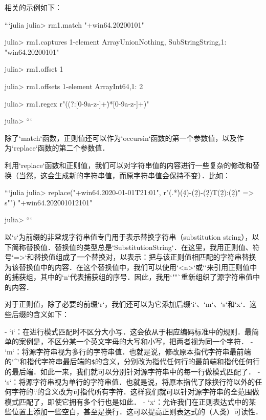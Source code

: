 相关的示例如下：

```julia
julia> rm1.match
"+win64.20200101"

julia> rm1.captures
1-element Array{Union{Nothing, SubString{String}},1}:
 "win64.20200101"

julia> rm1.offset
1

julia> rm1.offsets
1-element Array{Int64,1}:
 2

julia> rm1.regex
r"\+((?:[0-9a-z-]+\.)*[0-9a-z-]+)"

julia> 
```

除了`match`函数，正则值还可以作为`occursin`函数的第一个参数值，以及作为`replace`函数的第二个参数值．

利用`replace`函数和正则值，我们可以对字符串值的内容进行一些复杂的修改和替换（当然，这会生成新的字符串值，而原字符串值会保持不变）．比如：

```julia
julia> replace("+win64.2020-01-01T21:01", r"(.*\.)(\d{4})-(\d{2})-(\d{2})T(\d{2}):(\d{2})" => s"\1\2\3\4\5\6")
"+win64.202001012101"

julia> 
```

以`s`为前缀的非常规字符串值专门用于表示替换字符串（substitution string），以下简称替换值．替换值的类型总是`SubstitutionString`．在这里，我用正则值、符号`=>`和替换值组成了一个替换对，以表示：把与该正则值相匹配的字符串替换为该替换值中的内容．在这个替换值中，我们可以使用`\g<n>`或`\n`来引用正则值中的捕获组，其中的`n`代表捕获组的序号．因此，我用`"\1\2\3\4\5\6"`重新组织了源字符串值中的内容．

对于正则值，除了必要的前缀`r`，我们还可以为它添加后缀`i`、`m`、`s`和`x`．这些后缀的含义如下：

- `i`：在进行模式匹配时不区分大小写．这会依从于相应编码标准中的规则．最简单的案例是，不区分某一个英文字母的大写和小写，把两者视为同一个字符．
- `m`：将源字符串视为多行的字符串值．也就是说，修改原本指代字符串最前端的`^`和指代字符串最后端的\verb|$|的含义，分别改为指代任何行的最前端和指代任何行的最后端．如此一来，我们就可以分别针对源字符串中的每一行做模式匹配了．
- `s`：将源字符串视为单行的字符串值．也就是说，将原本指代了除换行符以外的任何字符的`.`的含义改为可指代所有字符．这样我们就可以针对源字符串的全范围做模式匹配了，即使它拥有多个行也是如此．
- `x`：允许我们在正则表达式中的某些位置上添加一些空白，甚至是换行．这可以提高正则表达式的（人类）可读性．

